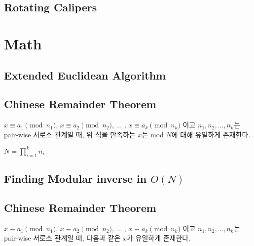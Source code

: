 \documentclass[10pt,landscape,a4paper,twocolumn]{article}
\begin{document}
\subsection{Rotating Calipers}


\iffalse
\subsection{Plane Sweeping with Segment Tree}
시간복잡도 : $O(N\log{N})$

\fi



\section{Math}
\subsection{Extended Euclidean Algorithm}


\subsection{Chinese Remainder Theorem}
$x \equiv a_1 \pmod{n_1}$, $x \equiv a_2 \pmod{n_2}$, ... , $x \equiv a_k \pmod{n_k}$ 이고 $n_1, n_2, ... , n_k$는 pair-wise 서로소 관계일 때, 위 식을 만족하는 $x$는 mod $N$에 대해 유일하게 존재한다.\\
\begin{large}
$N = \prod_{i=1}^k {n_i}$
\end{large}


\subsection{Finding Modular inverse in $O(N)$}


\subsection{Chinese Remainder Theorem}
$x \equiv a_1 \pmod{n_1}$, $x \equiv a_2 \pmod{n_2}$, ... , $x \equiv a_k \pmod{n_k}$ 이고 $n_1, n_2, ... , n_k$는 pair-wise 서로소 관계일 때, 다음과 같은 $x$가 유일하게 존재한다.\\
\end{document}
